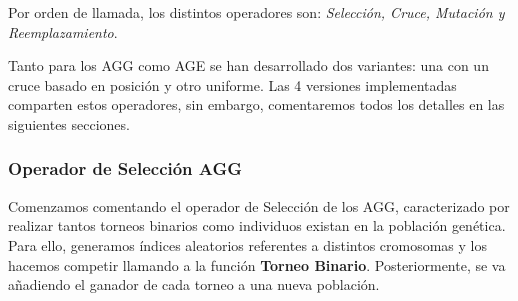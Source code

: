\begin{itemize}
\begin{figure}[H]
\begin{minipage}{.86\linewidth}
\begin{algorithm}[H]
				
				
			\end{algorithm} 
			
		\end{minipage}
	\end{figure}

\end{itemize}















Por orden de llamada, los distintos operadores son: \textit{Selección, Cruce, Mutación y Reemplazamiento}.

Tanto para los AGG como AGE se han desarrollado dos variantes: una con un cruce basado en posición y otro uniforme.
Las 4 versiones implementadas comparten estos operadores, sin embargo, comentaremos todos los detalles en las siguientes secciones.



\newpage 
\subsubsection{Operador de Selección AGG}

Comenzamos comentando el operador de Selección de los AGG, caracterizado por realizar tantos torneos binarios como individuos existan en la población genética. Para ello, generamos índices aleatorios referentes a distintos cromosomas y los hacemos competir llamando a la función \textbf{Torneo Binario}. Posteriormente, se va añadiendo el ganador de cada torneo a una nueva población.

